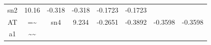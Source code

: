 \documentclass[]{article}
\theoremstyle{definition}
\theoremstyle{definition}
\theoremstyle{definition}
\theoremstyle{remark}
\begin{document}
\begin{longtable}[]{@{}cccccccc@{}}
\begin{minipage}[t]{0.07\columnwidth}
sn2\strut
\end{minipage} & \begin{minipage}[t]{0.09\columnwidth}\centering\strut
10.16\strut
\end{minipage} & \begin{minipage}[t]{0.11\columnwidth}\centering\strut
-0.318\strut
\end{minipage} & \begin{minipage}[t]{0.11\columnwidth}\centering\strut
-0.318\strut
\end{minipage} & \begin{minipage}[t]{0.12\columnwidth}\centering\strut
-0.1723\strut
\end{minipage} & \begin{minipage}[t]{0.12\columnwidth}\centering\strut
-0.1723\strut
\end{minipage}\tabularnewline
\begin{minipage}[t]{0.07\columnwidth}\centering\strut
AT\strut
\end{minipage} & \begin{minipage}[t]{0.05\columnwidth}\centering\strut
=\textasciitilde{}\strut
\end{minipage} & \begin{minipage}[t]{0.07\columnwidth}\centering\strut
sn4\strut
\end{minipage} & \begin{minipage}[t]{0.09\columnwidth}\centering\strut
9.234\strut
\end{minipage} & \begin{minipage}[t]{0.11\columnwidth}\centering\strut
-0.2651\strut
\end{minipage} & \begin{minipage}[t]{0.11\columnwidth}\centering\strut
-0.3892\strut
\end{minipage} & \begin{minipage}[t]{0.12\columnwidth}\centering\strut
-0.3598\strut
\end{minipage} & \begin{minipage}[t]{0.12\columnwidth}\centering\strut
-0.3598\strut
\end{minipage}\tabularnewline
\begin{minipage}[t]{0.07\columnwidth}\centering\strut
a1\strut
\end{minipage} & \begin{minipage}[t]{0.05\columnwidth}\centering\strut
\textasciitilde{}\textasciitilde{}\strut
\end{minipage} & \begin{minipage}[t]{0.07\columnwidth}\centering\strut

\end{minipage}
\end{longtable}
\end{document}
